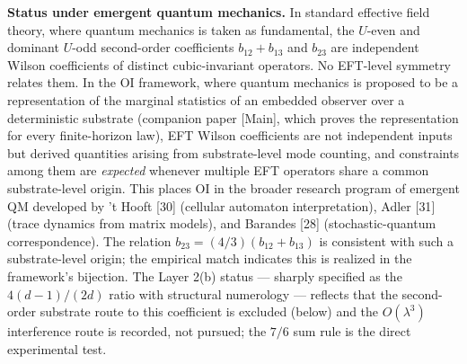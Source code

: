 \documentclass[
]{article}
\begin{document}
\textbf{Status under emergent quantum mechanics.} In standard effective
field theory, where quantum mechanics is taken as fundamental, the
\(U\)-even and dominant \(U\)-odd second-order coefficients
\(b_{12}+b_{13}\) and \(b_{23}\) are independent Wilson coefficients of
distinct cubic-invariant operators. No EFT-level symmetry relates them.
In the OI framework, where quantum mechanics is proposed to be a
representation of the marginal statistics of an embedded observer over a
deterministic substrate (companion paper {[}Main{]}, which proves the
representation for every finite-horizon law), EFT Wilson coefficients
are not independent inputs but derived quantities arising from
substrate-level mode counting, and constraints among them are
\emph{expected} whenever multiple EFT operators share a common
substrate-level origin. This places OI in the broader research program
of emergent QM developed by 't Hooft {[}30{]} (cellular automaton
interpretation), Adler {[}31{]} (trace dynamics from matrix models), and
Barandes {[}28{]} (stochastic-quantum correspondence). The relation
\(b_{23} = (4/3)(b_{12}+b_{13})\) is consistent with such a
substrate-level origin; the empirical match indicates this is realized
in the framework's bijection. The Layer 2(b) status --- sharply
specified as the \(4(d-1)/(2d)\) ratio with structural numerology ---
reflects that the second-order substrate route to this coefficient is
excluded (below) and the \(O(\lambda^3)\) interference route is
recorded, not pursued; the \(7/6\) sum rule is the direct experimental
test.
\end{document}
